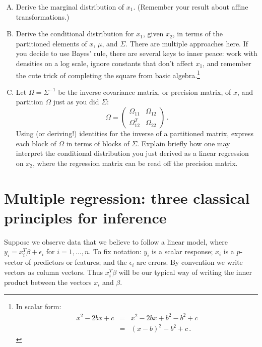 \documentclass{mynotes}
\begin{document}
\begin{enumerate}[(A)]

\item Derive the marginal distribution of $x_1$. (Remember your result about affine transformations.)

\item Derive the conditional distribution for $x_1$, given $x_2$, in terms of the partitioned elements of $x$, $\mu$, and $\Sigma$.  There are multiple approaches here.  If you decide to use Bayes' rule, there are several keys to inner peace: work with densities on a log scale, ignore constants that don't affect $x_1$, and remember the cute trick of completing the square from basic algebra.\footnote{In scalar form:
\begin{eqnarray*}
x^2 - 2bx + c &=& x^2 - 2bx + b^2 - b^2 + c \\
&=& (x-b)^2 - b^2 + c \, .
\end{eqnarray*}
}

\item Let $\Omega = \Sigma^{-1}$ be the inverse covariance matrix, or precision matrix, of $x$, and partition $\Omega$ just as you did $\Sigma$:
$$
\Omega =
\left(
\begin{array}{cc}
\Omega_{11} & \Omega_{12} \\
\Omega_{12}^T & \Omega_{22} 
\end{array}
\right) \, .
$$
Using (or deriving!) identities for the inverse of a partitioned matrix, express each block of $\Omega$ in terms of blocks of $\Sigma$.  Explain briefly how one may interpret the conditional distribution you just derived as a linear regression on $x_2$, where the regression matrix can be read off the precision matrix.

\end{enumerate}

\newpage

\section{Multiple regression: three classical principles for inference}

Suppose we observe data that we believe to follow a linear model, where $y_i = x_i^T \beta + \epsilon_i$ for $i = 1, \ldots, n$.
To fix notation: $y_i$ is a scalar response; $x_i$ is a $p$-vector of predictors or features; and the $\epsilon_i$ are errors.  By convention we write vectors as column vectors.  Thus $x_i^T \beta$ will be our typical way of writing the inner product between the vectors $x_i$ and $\beta$.
\end{document}
